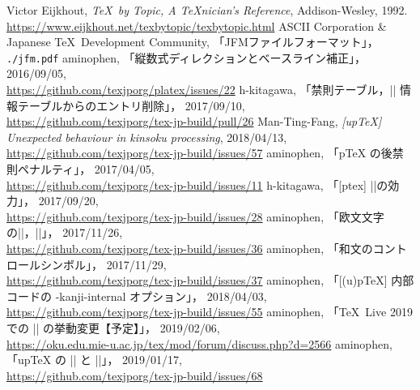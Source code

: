 \documentclass[a4paper,11pt,nomag]{jsarticle}
\begin{document}
\begin{thebibliography}{99}
  Victor Eijkhout, \textit{\TeX\ by Topic, A \TeX nician's Reference},
  Addison-Wesley, 1992.\\
  \url{https://www.eijkhout.net/texbytopic/texbytopic.html}
  ASCII Corporation \& Japanese \TeX\ Development Community, 「JFMファイルフォーマット」，
  \texttt{./jfm.pdf}
  aminophen, 「縦数式ディレクションとベースライン補正」，
  2016/09/05,\\
  \url{https://github.com/texjporg/platex/issues/22}
  h-kitagawa, 「禁則テーブル，|\inhibitxspcode| 情報テーブルからのエントリ削除」，
  2017/09/10,\\
  \url{https://github.com/texjporg/tex-jp-build/pull/26}
  Man-Ting-Fang, \textit{[upTeX] Unexpected behaviour in kinsoku processing},
  2018/04/13,\\
  \url{https://github.com/texjporg/tex-jp-build/issues/57}
  aminophen, 「pTeX の後禁則ペナルティ」，
  2017/04/05,\\
  \url{https://github.com/texjporg/tex-jp-build/issues/11}
  h-kitagawa, 「[ptex] |\inhibitglue|の効力」，
  2017/09/20,\\
  \url{https://github.com/texjporg/tex-jp-build/issues/28}
  aminophen, 「欧文文字の|\kansujichar|，|\inhibitxspcode|」，
  2017/11/26,\\
  \url{https://github.com/texjporg/tex-jp-build/issues/36}
\iffalse %
 \bibitem{build93} aminophen, 「[ptex] reading |\kansujichar|」，
  2019/10/14,\\
  \url{https://github.com/texjporg/tex-jp-build/issues/93}
\fi %
  aminophen, 「和文のコントロールシンボル」，
  2017/11/29,\\
  \url{https://github.com/texjporg/tex-jp-build/issues/37}
  aminophen, 「[(u)pTeX] 内部コードの -kanji-internal オプション」，
  2018/04/03,\\
  \url{https://github.com/texjporg/tex-jp-build/issues/55}
  aminophen, 「\TeX~Live 2019 での |\inhibitglue| の挙動変更【予定】」，
  2019/02/06,\\
  \url{https://oku.edu.mie-u.ac.jp/tex/mod/forum/discuss.php?d=2566}
  aminophen, 「upTeX の |\if| と |\ifcat|」，
  2019/01/17,\\
  \url{https://github.com/texjporg/tex-jp-build/issues/68}
\end{thebibliography}

\newpage
\printindex
\end{document}
